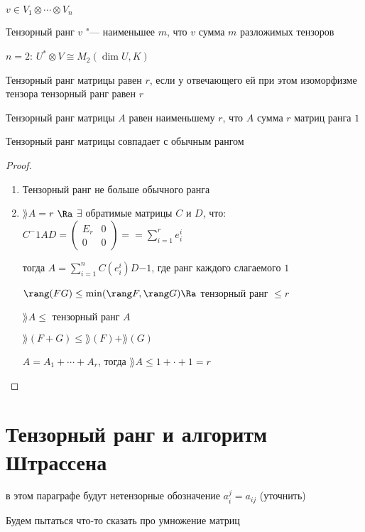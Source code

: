 \begin{Def}
    $v \in V_1 \otimes \cdots \otimes V_n$

    Тензорный ранг $v$ "--- наименьшее $m$, что $v$ сумма $m$ разложимых тензоров
\end{Def}

$n = 2$: $U^* \otimes V \cong M_2(\dim U, K)$

Тензорный ранг матрицы равен $r$, если у отвечающего ей при этом изоморфизме тензора тензорный ранг равен $r$

Тензорный ранг матрицы $A$ равен наименьшему $r$, что $A$ сумма $r$ матриц ранга $1$

\begin{theorem}
    Тензорный ранг матрицы совпадает с обычным рангом
\end{theorem}

\begin{proof}
    \begin{enumerate}
        \item Тензорный ранг не больше обычного ранга
        \item $\rang A = r$ $\Ra$ $\exists$ обратимые матрицы $C$ и $D$, что:
            $C^-1AD = 
            \begin{pmatrix}
                 E_r & 0 \\
                 0 & 0 
            \end{pmatrix} == \sum_{i = 1}^r e_i^i$

            тогда $A = \sum_{i=1}^n C(e_i^i)D{-1}$, где ранг каждого слагаемого $1$

            $\rang (F G) \leq \min (\rang F, \rang G) \Ra$ тензорный ранг $\leq r$

            $\rang A \leq $ тензорный ранг $A$

            $\rang(F + G) \leq \rang(F) + \rang(G)$

            $A = A_1 + \cdots + A_r$, тогда $\rang A \leq 1 + \cdot + 1 = r$
    \end{enumerate}
\end{proof}

\section{Тензорный ранг и алгоритм Штрассена}

в этом параграфе будут нетензорные обозначение $a_i^j = a_{ij}$ (уточнить)

Будем пытаться что-то сказать про умножение матриц

